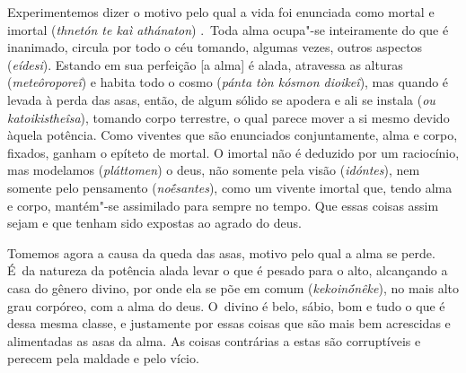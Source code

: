 Experimentemos dizer o motivo pelo qual a vida foi enunciada como mortal
e imortal (\emph{thnetón te kaì athánaton}) .~Toda alma ocupa"-se
inteiramente do que é inanimado, circula por todo o céu tomando, algumas
vezes, outros aspectos (\emph{eídesi}). \bekker{[246c]} Estando em sua
perfeição [a alma] é alada, atravessa as alturas
(\emph{meteôroporeî}) e habita todo o cosmo (\emph{pánta tòn kósmon
dioikeî}), mas quando é levada à perda das asas, então, de algum sólido
se apodera e ali se instala (\emph{ou katoikistheîsa}), tomando corpo
terrestre, o qual parece mover a si mesmo devido àquela potência. Como
viventes que são enunciados conjuntamente, alma e corpo, fixados, ganham
o epíteto de mortal. O imortal não é deduzido por um raciocínio,
mas modelamos (\emph{pláttomen}) o deus, não somente pela visão
(\emph{idóntes}), nem somente pelo pensamento (\emph{noḗsantes}), como
um vivente imortal que, tendo alma e corpo, mantém"-se assimilado para
sempre no tempo. \bekker{[246d]} Que essas coisas assim sejam e que tenham
sido expostas ao agrado do deus.

Tomemos agora a causa da queda das asas, motivo pelo qual a alma se
perde. É~da natureza da potência alada levar o que é pesado para o alto,
alcançando a casa do gênero divino, por onde ela se põe em comum
(\emph{kekoinṓnêke}), no mais alto grau corpóreo, com a alma do deus. O~divino é belo, sábio, bom e tudo o que é dessa mesma classe, \bekker{[246e]}
e justamente por essas coisas que são mais bem acrescidas e alimentadas
as asas da alma. As coisas contrárias a estas são corruptíveis e perecem
pela maldade e pelo vício.

